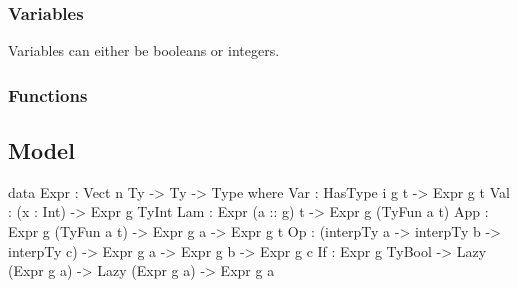 \begin{prooftree}
\end{prooftree}


\subsubsection{Variables}
\label{sec:types:rules:variables}
Variables can either be booleans or integers.
\begin{prooftree}
\end{prooftree}

\begin{prooftree}
\end{prooftree}

\subsubsection{Functions}
\label{sec:types:rules:functions}

\begin{prooftree}
\end{prooftree}

\begin{prooftree}
\end{prooftree}

\begin{prooftree}
\end{prooftree}

\subsection{Model}
\label{sec:lambda:model}
\begin{code}
data Expr : Vect n Ty -> Ty -> Type where
    Var : HasType i g t   -> Expr g t
    Val : (x : Int)       -> Expr g TyInt
    Lam : Expr (a :: g) t -> Expr g (TyFun a t)
    App : Expr g (TyFun a t) -> Expr g a -> Expr g t
    Op  : (interpTy a -> interpTy b -> interpTy c)
            -> Expr g a
            -> Expr g b
            -> Expr g c
    If  : Expr g TyBool
          -> Lazy (Expr g a)
          -> Lazy (Expr g a)
          -> Expr g a
\end{code}

